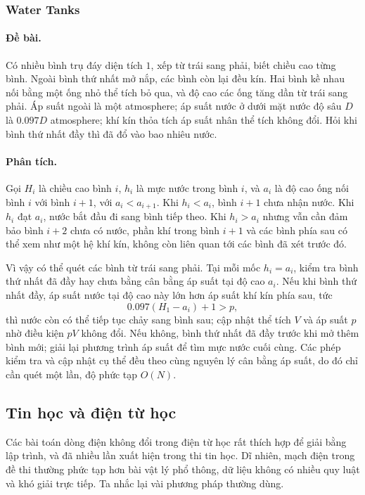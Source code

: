 \documentclass[11pt]{article}
\begin{document}
\subsubsection{Water Tanks}

\paragraph{Đề bài.}
Có nhiều bình trụ đáy diện tích \(1\), xếp từ trái sang phải, biết chiều cao
từng bình. Ngoài bình thứ nhất mở nắp, các bình còn lại đều kín. Hai bình kề
nhau nối bằng một ống nhỏ thể tích bỏ qua, và độ cao các ống tăng dần từ trái
sang phải. Áp suất ngoài là một atmosphere; áp suất nước ở dưới mặt nước độ sâu
\(D\) là \(0.097D\) atmosphere; khí kín thỏa tích áp suất nhân thể tích không
đổi. Hỏi khi bình thứ nhất đầy thì đã đổ vào bao nhiêu nước.

\paragraph{Phân tích.}
Gọi \(H_i\) là chiều cao bình \(i\), \(h_i\) là mực nước trong bình \(i\), và
\(a_i\) là độ cao ống nối bình \(i\) với bình \(i+1\), với \(a_i<a_{i+1}\).
Khi \(h_i<a_i\), bình \(i+1\) chưa nhận nước. Khi \(h_i\) đạt \(a_i\), nước bắt
đầu đi sang bình tiếp theo. Khi \(h_i>a_i\) nhưng vẫn cần đảm bảo bình \(i+2\)
chưa có nước, phần khí trong bình \(i+1\) và các bình phía sau có thể xem như
một hệ khí kín, không còn liên quan tới các bình đã xét trước đó.

Vì vậy có thể quét các bình từ trái sang phải. Tại mỗi mốc \(h_i=a_i\), kiểm
tra bình thứ nhất đã đầy hay chưa bằng cân bằng áp suất tại độ cao \(a_i\). Nếu
khi bình thứ nhất đầy, áp suất nước tại độ cao này lớn hơn áp suất khí kín phía
sau, tức
\[
  0.097(H_1-a_i)+1>p,
\]
thì nước còn có thể tiếp tục chảy sang bình sau; cập nhật thể tích \(V\) và áp
suất \(p\) nhờ điều kiện \(pV\) không đổi. Nếu không, bình thứ nhất đã đầy trước
khi mở thêm bình mới; giải lại phương trình áp suất để tìm mực nước cuối cùng.
Các phép kiểm tra và cập nhật cụ thể đều theo cùng nguyên lý cân bằng áp suất,
do đó chỉ cần quét một lần, độ phức tạp \(O(N)\).

\subsection{Tin học và điện từ học}

Các bài toán dòng điện không đổi trong điện từ học rất thích hợp để giải bằng
lập trình, và đã nhiều lần xuất hiện trong thi tin học. Dĩ nhiên, mạch điện
trong đề thi thường phức tạp hơn bài vật lý phổ thông, dữ liệu không có nhiều
quy luật và khó giải trực tiếp. Ta nhắc lại vài phương pháp thường dùng.
\end{document}
